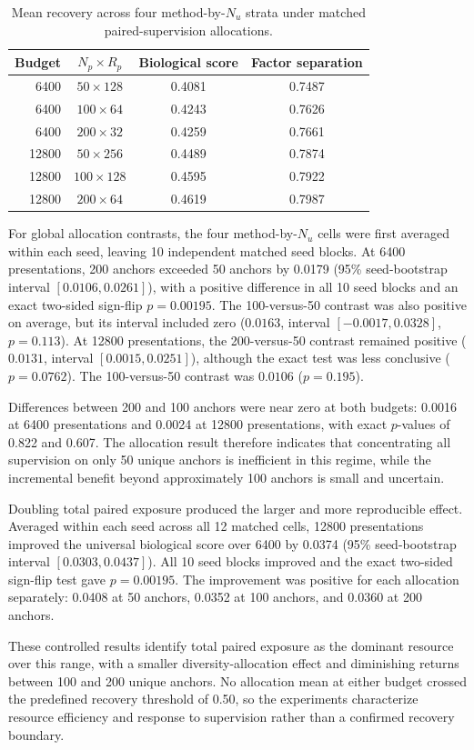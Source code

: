 \begin{table}[t]
\centering
\caption{Mean recovery across four method-by-$N_u$ strata under matched paired-supervision allocations.}
\small
\begin{tabular}{rccc}
\toprule
Budget & $N_p\times R_p$ & Biological score & Factor separation\\
\midrule
6400 & $50\times128$ & 0.4081 & 0.7487\\
6400 & $100\times64$ & 0.4243 & 0.7626\\
6400 & $200\times32$ & 0.4259 & 0.7661\\
12800 & $50\times256$ & 0.4489 & 0.7874\\
12800 & $100\times128$ & 0.4595 & 0.7922\\
12800 & $200\times64$ & 0.4619 & 0.7987\\
\bottomrule
\end{tabular}
\end{table}

For global allocation contrasts, the four method-by-$N_u$ cells were first averaged within each seed, leaving 10 independent matched seed blocks. At 6400 presentations, 200 anchors exceeded 50 anchors by 0.0179 (95\% seed-bootstrap interval $[0.0106,0.0261]$), with a positive difference in all 10 seed blocks and an exact two-sided sign-flip $p=0.00195$. The 100-versus-50 contrast was also positive on average, but its interval included zero ($0.0163$, interval $[-0.0017,0.0328]$, $p=0.113$). At 12800 presentations, the 200-versus-50 contrast remained positive ($0.0131$, interval $[0.0015,0.0251]$), although the exact test was less conclusive ($p=0.0762$). The 100-versus-50 contrast was $0.0106$ ($p=0.195$).

Differences between 200 and 100 anchors were near zero at both budgets: 0.0016 at 6400 presentations and 0.0024 at 12800 presentations, with exact $p$-values of 0.822 and 0.607. The allocation result therefore indicates that concentrating all supervision on only 50 unique anchors is inefficient in this regime, while the incremental benefit beyond approximately 100 anchors is small and uncertain.

Doubling total paired exposure produced the larger and more reproducible effect. Averaged within each seed across all 12 matched cells, 12800 presentations improved the universal biological score over 6400 by 0.0374 (95\% seed-bootstrap interval $[0.0303,0.0437]$). All 10 seed blocks improved and the exact two-sided sign-flip test gave $p=0.00195$. The improvement was positive for each allocation separately: 0.0408 at 50 anchors, 0.0352 at 100 anchors, and 0.0360 at 200 anchors.

These controlled results identify total paired exposure as the dominant resource over this range, with a smaller diversity-allocation effect and diminishing returns between 100 and 200 unique anchors. No allocation mean at either budget crossed the predefined recovery threshold of 0.50, so the experiments characterize resource efficiency and response to supervision rather than a confirmed recovery boundary.

